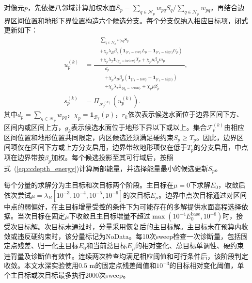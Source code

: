 \documentclass[authoryear,preprint,12pt]{elsarticle}
\begin{document}
对像元\(p\)，先依据八邻域计算加权水面\(\bar S_p=\sum_{q\in\mathcal N_p}w_{pq}S_q/\sum_{q\in\mathcal N_p}w_{pq}\)，再结合边界区间位置和地形下界位置构造六个候选分支。每个分支仅纳入相应目标项，闭式更新如下：
\begin{equation}\label{eq:ccdepth_update}
\begin{aligned}
u_p^{(k)}&=\frac{\begin{aligned}
 &\sum_{q\in\mathcal N_p}w_{pq}S_q\\
 &+\chi_p\lambda_B\beta_p\left(\mathbf{1}_{\{r_k=\mathrm{low}\}}L_p+\mathbf{1}_{\{r_k=\mathrm{high}\}}U_p\right)\\
 &+\chi_p\lambda_T\mathbf{1}_{\{g_k=\mathrm{below}\}}T_p+\chi_p\mu\beta_pm_p
 \end{aligned}}{\begin{aligned}
 &d_p\\
 &+\chi_p\lambda_B\beta_p\left(\mathbf{1}_{\{r_k=\mathrm{low}\}}+\mathbf{1}_{\{r_k=\mathrm{high}\}}\right)\\
 &+\chi_p\lambda_T\mathbf{1}_{\{g_k=\mathrm{below}\}}+\chi_p\mu\beta_p
 \end{aligned}},\\
s_p^{(k)}&=\Pi_{\mathcal F_p^{(k)}}\!\left(u_p^{(k)}\right).
\end{aligned}
\end{equation}
其中\(d_p=\sum_{q\in\mathcal N_p}w_{pq}\)，\(\chi_p=\mathbf{1}_{\mathcal B_f}(p)\)，\(r_k\)依次表示候选水面位于边界区间下方、区间内或区间上方，\(g_k\)表示候选水面位于地形下界以下或以上。集合\(\mathcal F_p^{(k)}\)由相应区间位置和地形位置共同限定，内区候选还须满足硬约束\(S_p\geq T_p\)。因此，边界区间项仅在区间下方或上方分支启用，边界带软地形项仅在低于\(T_p\)的分支启用，中点项在边界带按\(\beta_p\)加权。每个候选投影至其可行域后，按照式~(\ref{eq:ccdepth_energy})计算局部能量，并选择能量最小的候选更新\(S_p\)。

每个分量的求解分为主目标和次目标两个阶段。主目标在\(\mu=0\)下求解\(E_0\)，收敛后依次尝试\(\mu=\lambda_B[10^{-3},10^{-4},10^{-5},10^{-6}]\)的次目标\(E_\mu\)。边界中点次目标通过对区间中点的弱偏好，在主目标增量受控的条件下为可能存在的多解提供水面高程选择依据。当次目标在固定\(\mu\)下收敛且主目标增量不超过\(\max(10^{-4}E_0^{\mathrm{base}},10^{-8})\)时，接受次目标解。次目标未通过时，分量采用恢复后的主目标解。主目标未在预算内收敛或违反硬约束时，该分量标记为NoData。每10次sweep检查一次诊断量，包括固定点残差、归一化主目标\(E_0\)和当前总目标\(E_\mu\)的相对变化、总目标单调性、硬约束违背量及诊断值有效性。连续两次检查均满足相应阈值和可行条件后，该阶段判定收敛。本文水深实验使用\(0.5\) m的固定点残差阈值和\(10^{-3}\)的目标相对变化阈值，单个主目标或次目标最多执行2000次sweep。
\end{document}
